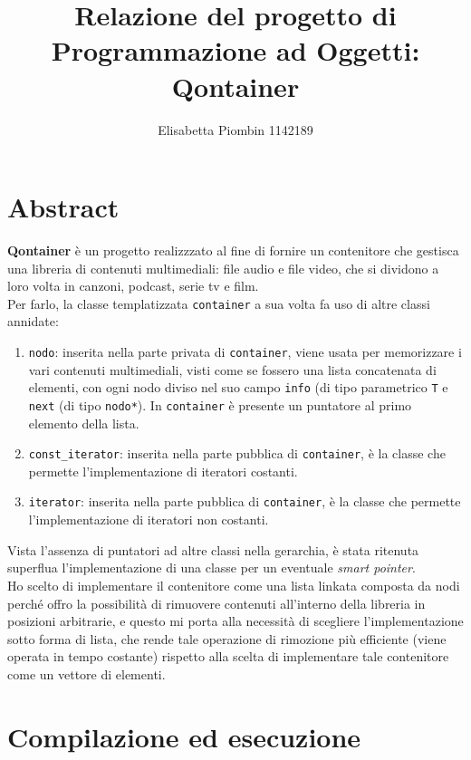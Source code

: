 \documentclass[a4paper,10pt]{article}
\begin{document}
\title {Relazione del progetto di Programmazione ad Oggetti: Qontainer}
\author {Elisabetta Piombin 1142189}
\date{}

\maketitle
\clearpage
\tableofcontents
\clearpage\mbox{}

\section{Abstract}
\textbf{Qontainer} è un progetto realizzzato al fine di fornire un contenitore che gestisca una libreria di contenuti multimediali: file audio e file video, che si dividono a loro volta in canzoni, podcast, serie tv e film. \\
Per farlo, la classe templatizzata \texttt{container} a sua volta fa uso di altre classi annidate:
\begin{enumerate}
\item \texttt{nodo}: inserita nella parte privata di \texttt{container}, viene usata per memorizzare i vari contenuti multimediali, visti come se fossero una lista concatenata di elementi, con ogni nodo diviso nel suo campo \texttt{info} (di tipo parametrico \texttt{T} e \texttt{next} (di tipo \texttt{nodo*}). In \texttt{container} è presente un puntatore al primo elemento della lista.
\item \texttt{const\_iterator}: inserita nella parte pubblica di \texttt{container}, è la classe che permette l'implementazione di iteratori costanti.
\item \texttt{iterator}: inserita nella parte pubblica di \texttt{container}, è la classe che permette l'implementazione di iteratori non costanti.
\end{enumerate}
Vista l'assenza di puntatori ad altre classi nella gerarchia, è stata ritenuta superflua l'implementazione di una classe per un eventuale \textit{smart pointer}.\\
Ho scelto di implementare il contenitore come una lista linkata composta da nodi perché offro la possibilità di rimuovere contenuti all'interno della libreria in posizioni arbitrarie, e questo mi porta alla necessità di scegliere l'implementazione sotto forma di lista, che rende tale operazione di rimozione più efficiente (viene operata in tempo costante) rispetto alla scelta di implementare tale contenitore come un vettore di elementi.


\section{Compilazione ed esecuzione} 
\end{document}
